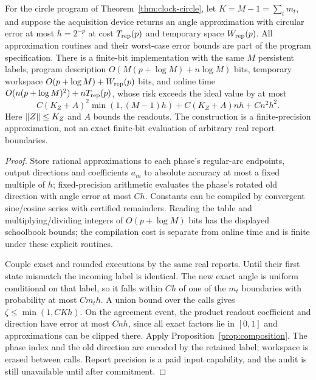 \begin{proposition}\label{prop:numerics}
For the circle program of Theorem~\ref{thm:clock-circle}, let $K=M-1=\sum_t m_t$, and suppose the acquisition device returns an angle approximation with circular error at most $h=2^{-p}$ at cost $T_{\rm rep}(p)$ and temporary space $W_{\rm rep}(p)$. All approximation routines and their worst-case error bounds are part of the program specification. There is a finite-bit implementation with the same $M$ persistent labels, program description
$O(M(p+\log M)+n\log M)$ bits, temporary workspace $O(p+\log M)+W_{\rm rep}(p)$ bits, and online time
$O(n(p+\log M)^2)+nT_{\rm rep}(p)$,
whose risk exceeds the ideal value by at most
\begin{equation}\label{eq:numeric-bound}
 C(K_Z+A)^2\min(1,(M-1)h)+C(K_Z+A)nh+C n^2h^2.
\end{equation}
Here $\left\lVert Z\right\rVert\le K_Z$ and $A$ bounds the readouts. The construction is a finite-precision approximation, not an exact finite-bit evaluation of arbitrary real report boundaries.
\end{proposition}
\begin{proof}
Store rational approximations to each phase's regular-arc endpoints, output directions and coefficients $a_m$ to absolute accuracy at most a fixed multiple of $h$; fixed-precision arithmetic evaluates the phase's rotated old direction with angle error at most $C h$. Constants can be compiled by convergent sine/cosine series with certified remainders. Reading the table and multiplying/dividing integers of $O(p+\log M)$ bits has the displayed schoolbook bounds; the compilation cost is separate from online time and is finite under these explicit routines.

Couple exact and rounded executions by the same real reports. Until their first state mismatch the incoming label is identical. The new exact angle is uniform conditional on that label, so it falls within $C h$ of one of the $m_t$ boundaries with probability at most $C m_t h$. A union bound over the calls gives $\zeta\le\min(1,CKh)$. On the agreement event, the product readout coefficient and direction have error at most $Cnh$, since all exact factors lie in $[0,1]$ and approximations can be clipped there. Apply Proposition~\ref{prop:composition}. The phase index and the old direction are encoded by the retained label; workspace is erased between calls. Report precision is a paid input capability, and the audit is still unavailable until after commitment.
\end{proof}


